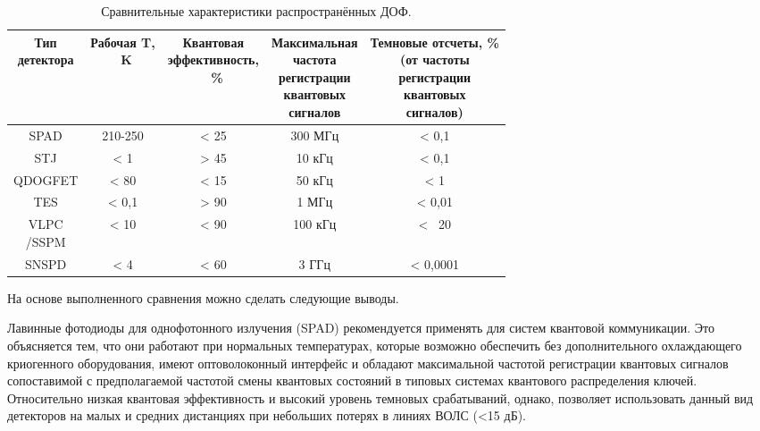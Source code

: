\begin{table} [htbp]
	\centering
	\caption{Сравнительные характеристики распространённых ДОФ.}
	\label{tab:SPD_compare}
	\begin{tabular}{| c | c | c | c | c |}
	
	 \hline \makecell{Тип \\детектора} & \makecell{Рабочая T,\\~K} & \makecell{Квантовая \\эффективность,\\~\%} & \makecell{Максимальная \\частота \\регистрации \\квантовых \\сигналов} & \makecell{Темновые отсчеты, \% \\(от частоты \\регистрации \\квантовых \\сигналов)}   \\ \hline
	  SPAD         & 210-250    & < 25    & 300 МГц     & < 0,1   \\ \hline
	  STJ	   	   & < 1        & > 45    & 10 кГц  	& < 0,1      \\ \hline
	  QDOGFET      & < 80       & < 15    & 50 кГц      & < 1       \\ \hline
	  TES          & < 0,1      & > 90    & 1 МГц       & < 0,01       \\ \hline
	  \makecell{VLPC\\/SSPM} & < 10      & < 90    & 100 кГц       & < ~20      \\ \hline
	  SNSPD          & < 4      & < 60    & 3 ГГц       & < 0,0001       \\ \hline
	  
	\end{tabular}
\end{table}

На основе выполненного сравнения можно сделать следующие выводы. 


Лавинные фотодиоды для однофотонного излучения (SPAD) рекомендуется применять для систем квантовой коммуникации. Это объясняется тем, что они работают при нормальных температурах, которые возможно обеспечить без дополнительного охлаждающего криогенного оборудования, имеют оптоволоконный интерфейс и обладают максимальной частотой регистрации квантовых сигналов сопоставимой с  предполагаемой частотой смены квантовых состояний в типовых системах квантового распределения ключей. Относительно низкая квантовая эффективность и высокий уровень темновых срабатываний, однако, позволяет использовать данный вид детекторов на малых и средних дистанциях при небольших потерях в линиях ВОЛС (<15 дБ).


